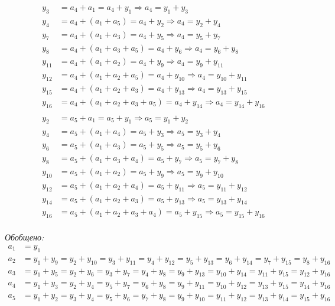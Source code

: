 \documentclass[11pt, oneside]{article}   	%
\begin{document}
\vspace{-7ex}
\begin{align*}
y_3 &= a_4 + a_1 = a_4 + y_1 \Rightarrow a_4 = y_1 + y_3 \\
y_4 &= a_4 + (a_1 + a_5) = a_4 + y_2 \Rightarrow a_4 = y_2 + y_4 \\
y_7 &= a_4 + (a_1 + a_3) = a_4 + y_5 \Rightarrow a_4 = y_5 + y_7 \\
y_8 &= a_4 + (a_1 + a_3 + a_5) = a_4 + y_6 \Rightarrow a_4 = y_6 + y_8 \\
y_{11} &= a_4 + (a_1 + a_2) = a_4 + y_9 \Rightarrow a_4 = y_9 + y_{11} \\
y_{12} &= a_4 + (a_1 + a_2 + a_5) = a_4 + y_{10} \Rightarrow a_4 = y_{10} + y_{11} \\
y_{15} &= a_4 + (a_1 + a_2 + a_3) = a_4 + y_{13} \Rightarrow a_4 = y_{13} + y_{15} \\
y_{16} &= a_4 + (a_1 + a_2 + a_3 + a_5) = a_4 + y_{14} \Rightarrow a_4 = y_{14} + y_{16} \\
\end{align*}
\vspace{-7ex}
\begin{align*}
y_2 &= a_5 + a_1 = a_5 + y_1 \Rightarrow a_5 = y_1 + y_2 \\
y_4 &= a_5 + (a_1 + a_4) = a_5 + y_3 \Rightarrow a_5 = y_3 + y_4 \\
y_6 &= a_5 + (a_1 + a_3) = a_5 + y_5 \Rightarrow a_5 = y_5 + y_6 \\
y_8 &= a_5 + (a_1 + a_3 + a_4) = a_5 + y_7 \Rightarrow a_5 = y_7 + y_8 \\
y_{10} &= a_5 + (a_1 + a_2) = a_5 + y_9 \Rightarrow a_5 = y_9 + y_{10} \\
y_{12} &= a_5 + (a_1 + a_2 + a_4) = a_5 + y_{11} \Rightarrow a_5 = y_{11} + y_{12} \\
y_{14} &= a_5 + (a_1 + a_2 + a_3) = a_5 + y_{13} \Rightarrow a_5 = y_{13} + y_{14} \\
y_{16} &= a_5 + (a_1 + a_2 + a_3 + a_4) = a_5 + y_{15} \Rightarrow a_5 = y_{15} + y_{16} \\
\end{align*}

\textit{Обобщено:}
\begin{align*}
a_1 &= y_1 \\
a_2 &= y_1 + y_9 = y_2 + y_{10} = y_3 + y_{11} = y_4 + y_{12} = y_5 + y_{13} = y_6 + y_{14} = y_7 + y_{15} = y_8 + y_{16} \\
a_3 &= y_1 + y_5 = y_2 + y_6 = y_3 + y_7 = y_4 + y_8 = y_9 + y_{13} = y_{10} + y_{14} = y_{11} + y_{15} = y_{12} + y_{16} \\
a_4 &= y_1 + y_3 = y_2 + y_4 = y_5 + y_7 = y_6 + y_8 = y_9 + y_{11} = y_{10} + y_{12} = y_{13} + y_{15} = y_{14} + y_{16} \\
a_5 &= y_1 + y_2 = y_3 + y_4 = y_5 + y_6 = y_7 + y_8 = y_9 + y_{10} = y_{11} + y_{12} = y_{13} + y_{14} = y_{15} + y_{16} \\
\end{align*}
\end{document}
